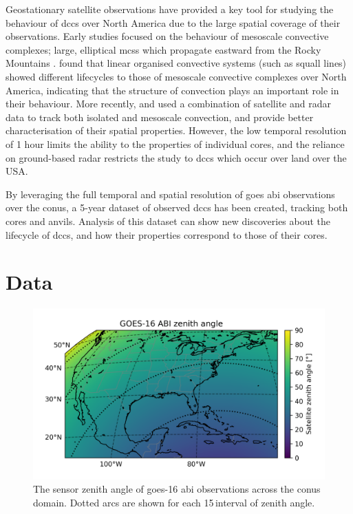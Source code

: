 Geostationary satellite observations have provided a key tool for studying the behaviour of \acrshort{dcc}s over North America due to the large spatial coverage of their observations.
Early studies focused on the behaviour of mesoscale convective complexes; large, elliptical \acrshort{mcs}s which propagate eastward from the Rocky Mountains \citep{maddox_mesoscale_1980, augustine_mesoscale_1988, augustine_mesoscale_1991}.
\citet{tsakraklides_global_2003a} found that linear organised convective systems (such as squall lines) showed different lifecycles to those of mesoscale convective complexes over North America, indicating that the structure of convection plays an important role in their behaviour.
More recently, \citet{feng_spatiotemporal_2019} and \citet{li_high-resolution_2021} used a combination of satellite and radar data to track both isolated and mesoscale convection, and provide better characterisation of their spatial properties.
However, the low temporal resolution of 1 hour limits the ability to the properties of individual cores, and the reliance on ground-based radar restricts the study to \acrshort{dcc}s which occur over land over the USA.

By leveraging the full temporal and spatial resolution of \acrshort{goes} \acrshort{abi} observations over the \acrshort{conus}, a 5-year dataset of observed \acrshort{dcc}s has been created, tracking both cores and anvils.
Analysis of this dataset can show new discoveries about the lifecycle of \acrshort{dcc}s, and how their properties correspond to those of their cores.

\section{Data} \label{sec:lifecycle_data}

\begin{figure}[tp]
    \centering
    \includegraphics[width=\textwidth]{figures/chapter2_01.png}
    \caption[
    The sensor zenith angle of \acrshort{goes}-16 \acrshort{abi} observations across the \acrshort{conus} domain
    ]{
    The sensor zenith angle of \acrshort{goes}-16 \acrshort{abi} observations across the \acrshort{conus} domain. Dotted arcs are shown for each 15\,\textdegree interval of zenith angle.
    }
    \label{fig:abi_zenith_angles}
\end{figure}

